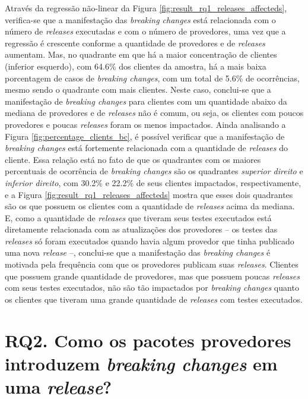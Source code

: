 Através da regressão não-linear da Figura \ref{fig:result_rq1_releases_affecteds}, verifica-se que a manifestação das \textit{breaking changes} está relacionada com o número de \textit{releases} executadas e com o número de provedores, uma vez que a regressão é crescente conforme a quantidade de provedores e de \textit{releases} aumentam. Mas, no quadrante em que há a maior concentração de clientes (inferior esquerdo), com 64.6\% dos clientes da amostra, há a mais baixa porcentagem de casos de \textit{breaking changes}, com um total de 5.6\% de ocorrências, mesmo sendo o quadrante com mais clientes. Neste caso, conclui-se que a manifestação de \textit{breaking changes} para clientes com um quantidade abaixo da mediana de provedores e de \textit{releases} não é comum, ou seja, os clientes com poucos provedores e poucas \textit{releases} foram os menos impactados. Ainda analisando a Figura \ref{fig:percentage_clients_bc}, é possível verificar que a manifestação de \textit{breaking changes} está fortemente relacionada com a quantidade de \textit{releases} do cliente. Essa relação está no fato de que os quadrantes com os maiores percentuais de ocorrência de \textit{breaking changes} são os quadrantes \textit{superior direito} e \textit{inferior direito}, com 30.2\% e 22.2\% de seus clientes impactados, respectivamente, e a Figura \ref{fig:result_rq1_releases_affecteds} mostra que esses dois quadrantes são os que possuem os clientes com a quantidade de \textit{releases} acima da mediana. E, como a quantidade de \textit{releases} que tiveram seus testes executados está diretamente relacionada com as atualizações dos provedores -- os testes das \textit{releases} só foram executados quando havia algum provedor que tinha publicado uma nova \textit{release} --, conclui-se que a manifestação das \textit{breaking changes} é motivada pela frequência com que os provedores publicam suas \textit{releases}. Clientes que possuem grande quantidade de provedores, mas que possuem poucas \textit{releases} com seus testes executados, não são tão impactados por \textit{breaking changes} quanto os clientes que tiveram uma grande quantidade de \textit{releases} com testes executados.



\section{RQ2. Como os pacotes provedores introduzem \textit{breaking changes} em uma \textit{release}?}
\label{sec:qp2:results}


